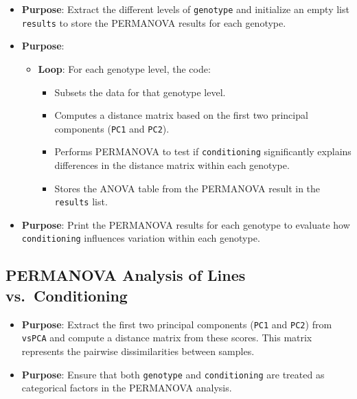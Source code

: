 \documentclass[
  11pt,
]{article}
\providecommand{\tightlist}{%
  \setlength{\itemsep}{0pt}\setlength{\parskip}{0pt}}\usepackage{longtable,booktabs,array}
\begin{document}
\begin{itemize}
\tightlist
\item
  \textbf{Purpose}: Extract the different levels of \texttt{genotype}
  and initialize an empty list \texttt{results} to store the PERMANOVA
  results for each genotype.
\end{itemize}

\begin{itemize}
\tightlist
\item
  \textbf{Purpose}:

  \begin{itemize}
  \tightlist
  \item
    \textbf{Loop}: For each genotype level, the code:

    \begin{itemize}
    \tightlist
    \item
      Subsets the data for that genotype level.
    \item
      Computes a distance matrix based on the first two principal
      components (\texttt{PC1} and \texttt{PC2}).
    \item
      Performs PERMANOVA to test if \texttt{conditioning} significantly
      explains differences in the distance matrix within each genotype.
    \item
      Stores the ANOVA table from the PERMANOVA result in the
      \texttt{results} list.
    \end{itemize}
  \end{itemize}
\end{itemize}

\begin{itemize}
\tightlist
\item
  \textbf{Purpose}: Print the PERMANOVA results for each genotype to
  evaluate how \texttt{conditioning} influences variation within each
  genotype.
\end{itemize}

\subsection{PERMANOVA Analysis of Lines
vs.~Conditioning}\label{permanova-analysis-of-lines-vs.-conditioning}

\begin{itemize}
\item
  \textbf{Purpose}: Extract the first two principal components
  (\texttt{PC1} and \texttt{PC2}) from \texttt{vsPCA} and compute a
  distance matrix from these scores. This matrix represents the pairwise
  dissimilarities between samples.
\item
  \textbf{Purpose}: Ensure that both \texttt{genotype} and
  \texttt{conditioning} are treated as categorical factors in the
  PERMANOVA analysis.
\end{itemize}
\end{document}
